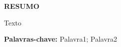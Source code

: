 

\begin{titlepage}

    \begin{center}
        \bf \uppercase {Resumo}
    \end{center}

    \vspace{0.8cm}
    
    Texto

    \textbf{Palavras-chave:} Palavra1; Palavra2
\end{titlepage}

\vspace{1.6cm}


    
    
     


